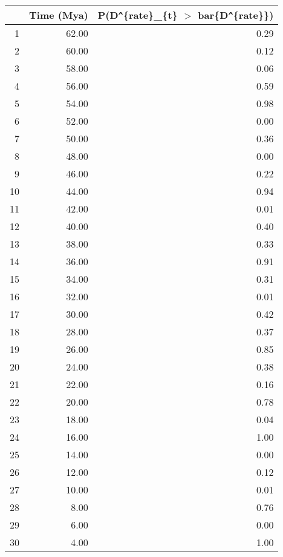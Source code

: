 \begin{table}[ht]
\centering
\begin{tabular}{rrr}
  \hline
 & Time (Mya) & P(D\verb|^|\{rate\}\_\{t\} $>$ bar\{D\verb|^|\{rate\}\}) \\ 
  \hline
1 & 62.00 & 0.29 \\ 
  2 & 60.00 & 0.12 \\ 
  3 & 58.00 & 0.06 \\ 
  4 & 56.00 & 0.59 \\ 
  5 & 54.00 & 0.98 \\ 
  6 & 52.00 & 0.00 \\ 
  7 & 50.00 & 0.36 \\ 
  8 & 48.00 & 0.00 \\ 
  9 & 46.00 & 0.22 \\ 
  10 & 44.00 & 0.94 \\ 
  11 & 42.00 & 0.01 \\ 
  12 & 40.00 & 0.40 \\ 
  13 & 38.00 & 0.33 \\ 
  14 & 36.00 & 0.91 \\ 
  15 & 34.00 & 0.31 \\ 
  16 & 32.00 & 0.01 \\ 
  17 & 30.00 & 0.42 \\ 
  18 & 28.00 & 0.37 \\ 
  19 & 26.00 & 0.85 \\ 
  20 & 24.00 & 0.38 \\ 
  21 & 22.00 & 0.16 \\ 
  22 & 20.00 & 0.78 \\ 
  23 & 18.00 & 0.04 \\ 
  24 & 16.00 & 1.00 \\ 
  25 & 14.00 & 0.00 \\ 
  26 & 12.00 & 0.12 \\ 
  27 & 10.00 & 0.01 \\ 
  28 & 8.00 & 0.76 \\ 
  29 & 6.00 & 0.00 \\ 
  30 & 4.00 & 1.00 \\ 
   \hline
\end{tabular}
\label{tab:rate_peak}
\end{table}
